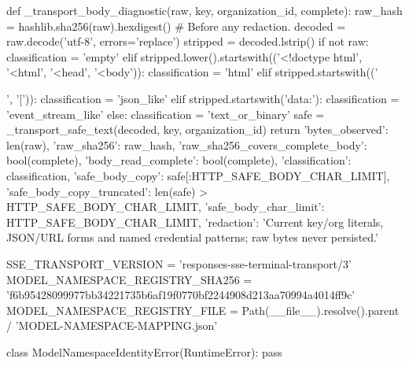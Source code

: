 def _transport_body_diagnostic(raw, key, organization_id, complete):
    raw_hash = hashlib.sha256(raw).hexdigest()  # Before any redaction.
    decoded = raw.decode('utf-8', errors='replace')
    stripped = decoded.lstrip()
    if not raw:
        classification = 'empty'
    elif stripped.lower().startswith(('<!doctype html', '<html', '<head', '<body')):
        classification = 'html'
    elif stripped.startswith(('{', '[')):
        classification = 'json_like'
    elif stripped.startswith('data:'):
        classification = 'event_stream_like'
    else:
        classification = 'text_or_binary'
    safe = _transport_safe_text(decoded, key, organization_id)
    return {'bytes_observed': len(raw), 'raw_sha256': raw_hash,
            'raw_sha256_covers_complete_body': bool(complete),
            'body_read_complete': bool(complete), 'classification': classification,
            'safe_body_copy': safe[:HTTP_SAFE_BODY_CHAR_LIMIT],
            'safe_body_copy_truncated': len(safe) > HTTP_SAFE_BODY_CHAR_LIMIT,
            'safe_body_char_limit': HTTP_SAFE_BODY_CHAR_LIMIT,
            'redaction': 'Current key/org literals, JSON/URL forms and named credential patterns; raw bytes never persisted.'}



SSE_TRANSPORT_VERSION = 'responses-sse-terminal-transport/3'
MODEL_NAMESPACE_REGISTRY_SHA256 = 'f6b95428099977bb34221735b6af19f0770bf2244908d213aa70994a4014ff9c'
MODEL_NAMESPACE_REGISTRY_FILE = Path(__file__).resolve().parent / 'MODEL-NAMESPACE-MAPPING.json'


class ModelNamespaceIdentityError(RuntimeError):
    pass


}
